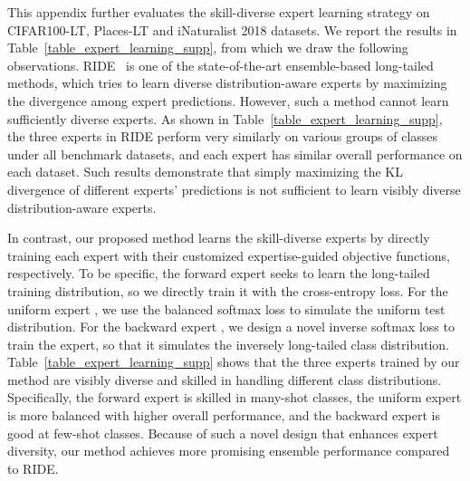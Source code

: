 \documentclass{article}
\begin{document}
This appendix further evaluates the skill-diverse expert learning strategy on CIFAR100-LT, Places-LT and iNaturalist 2018 datasets. We report the results  in Table~\ref{table_expert_learning_supp}, from which we draw the following observations.
 RIDE~\cite{wang2020long} is one of the state-of-the-art ensemble-based long-tailed methods, which  tries to learn diverse distribution-aware experts by maximizing the divergence among expert predictions. However, such a method cannot  learn sufficiently diverse experts. As shown in Table~\ref{table_expert_learning_supp},   the three experts in RIDE perform very similarly on various groups of classes under all benchmark datasets,  and each expert has   similar overall performance  on each     dataset. Such results demonstrate that simply maximizing the KL divergence of different experts' predictions is not sufficient to learn visibly diverse  distribution-aware experts.


In contrast, our proposed method learns the skill-diverse experts by directly training each expert with their customized expertise-guided objective functions, respectively. To be specific, the forward expert   seeks to learn the long-tailed  training distribution, so we directly train it with the cross-entropy loss. For the uniform expert , we use the balanced softmax loss to simulate the uniform test distribution. For the backward expert , we design a novel inverse softmax loss to train the expert, so that it   simulates the inversely long-tailed class distribution.  Table~\ref{table_expert_learning_supp} shows that the three experts trained by our method are visibly diverse  and skilled in handling different class distributions. Specifically, the forward expert is skilled in many-shot classes, the uniform expert is more balanced with higher overall  performance, and the backward expert is good at few-shot classes.  Because of such a novel design that enhances expert diversity, our method  achieves more promising ensemble performance compared to RIDE.

 
 
\end{document}
